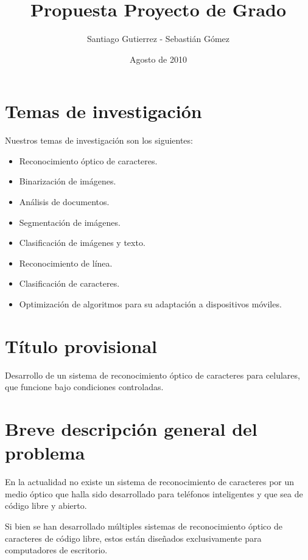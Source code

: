 \documentclass[a4paper, 11pt, oneside]{article}
\begin{document}
\title {Propuesta Proyecto de Grado}
\author { Santiago Gutierrez - Sebastián Gómez }
\date {Agosto de 2010}
\maketitle
	
	\clearpage
	\section{Temas de investigación}
   Nuestros temas de investigación son los siguientes:
	\begin{itemize}
   \item Reconocimiento óptico de caracteres.
   \item Binarización de imágenes.
   \item Análisis de documentos.
   \item Segmentación de imágenes.
   \item Clasificación de imágenes y texto.
   \item Reconocimiento de línea.
   \item Clasificación de caracteres.
	\item Optimización de algoritmos para su adaptación a dispositivos móviles.
	\end{itemize}
	\clearpage
	\section{Título provisional}
	Desarrollo de un sistema de reconocimiento óptico de caracteres para celulares, que funcione bajo condiciones controladas.
	\clearpage
	\section{Breve descripción general del problema}
	En la actualidad no existe un sistema de reconocimiento de caracteres por un medio óptico que halla sido desarrollado para teléfonos inteligentes y que sea de código libre y abierto.

	Si bien se han desarrollado múltiples sistemas de reconocimiento óptico de caracteres de código libre, estos están diseñados exclusivamente para computadores de escritorio.
\end{document}
